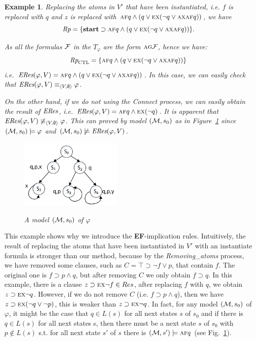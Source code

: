 \documentclass{article}
\newtheorem{example}{Example}
\begin{document}
\begin{example}
Replacing the atoms in $V'$ that have been instantiated, i.e. $f$ is replaced with $q$ and $z$ is  replaced with $\textsc{a}\textsc{f} q \wedge (q \vee \textsc{e} \textsc{x}(\neg q \vee \textsc{a}\textsc{x} \textsc{a}\textsc{f} q))$, we have
\[
\emph{Rp}= \{\textbf{start} \supset  \textsc{a}\textsc{f} q \wedge (q \vee \textsc{e} \textsc{x}(\neg q \vee \textsc{a}\textsc{x} \textsc{a}\textsc{f} q))\}.
\]

As all the formulas $\cal F$ in the $T_{\varphi}$ are the form $\textsc{a}\textsc{g} \cal F$, hence we have:
\[
\emph{Rp}_{\textrm{CTL}} = \{\textsc{a}\textsc{f} q \wedge (q \vee \textsc{e} \textsc{x}(\neg q \vee \textsc{a}\textsc{x} \textsc{a}\textsc{f} q))\}
\]
i.e. $\emph{ERes}(\varphi, V) = \textsc{a}\textsc{f} q \wedge (q \vee \textsc{e} \textsc{x}(\neg q \vee \textsc{a}\textsc{x} \textsc{a}\textsc{f} q))$.
In this case, we can easily check that $\emph{ERes}(\varphi, V) \equiv_{{\langle{V, \emptyset}\rangle}} \varphi$.


On the other hand, if we do not using the \emph{Connect} process, we can easily obtain the result of $\emph{ERes}$, i.e. $\emph{ERes}(\varphi, V) = \textsc{a}\textsc{f} q \wedge  \textsc{e} \textsc{x}(\neg q)$.
It is apparent that $\emph{ERes}(\varphi, V) \not\equiv_{{\langle{V, \emptyset}\rangle}} \varphi$. This can proved by model $({\cal M},s_0)$ as in Figure~\ref{Fig:models} since $({\cal M}, s_0) \models \varphi$ and $({\cal M}, s_0) \not \models \emph{ERes}(\varphi, V)$.
\begin{figure}[ht!]
  \centering
  \includegraphics[width=5cm]{models.png}\\
  \caption{A model $({\cal M}, s_0)$ of $\varphi$}\label{Fig:models}
\end{figure}
\end{example}

This example shows why we introduce the \textbf{EF}-implication rules. Intuitively, the result of replacing the atoms that have been instantiated in $V'$ with an instantiate formula is stronger than our method, because by the \emph{Removing\_atoms} process, we have removed some clauses, such as $C= \top \supset \neg f \vee p$, that contain $f$. The original one is $f \supset p \wedge q$, but after removing $C$ we only obtain  $f \supset q$. In this example, there is a clause $z \supset \textsc{e} \textsc{x} \neg f \in Res$, after replacing $f$ with $q$, we obtain $z \supset \textsc{e} \textsc{x} \neg q$. However, if we do not remove $C$ (i.e. $f \supset p \wedge q$), then we have $z \supset \textsc{e} \textsc{x} (\neg q \vee \neg p)$, this is weaker than $z \supset \textsc{e} \textsc{x} \neg q$.
In fact, for any model $({\cal M}, s_0)$ of $\varphi$, it might be the case that $q \in L(s)$ for all next states $s$ of $s_0$ and if there is $q \in L(s)$ for all next states s, then there must be a next state $s$ of $s_0$ with $p \not \in L(s)$ s.t. for all next state $s'$ of $s$ there is $({\cal M}, s')\models \textsc{a}\textsc{f} q$ (see Fig.~\ref{Fig:models}).
\end{document}
